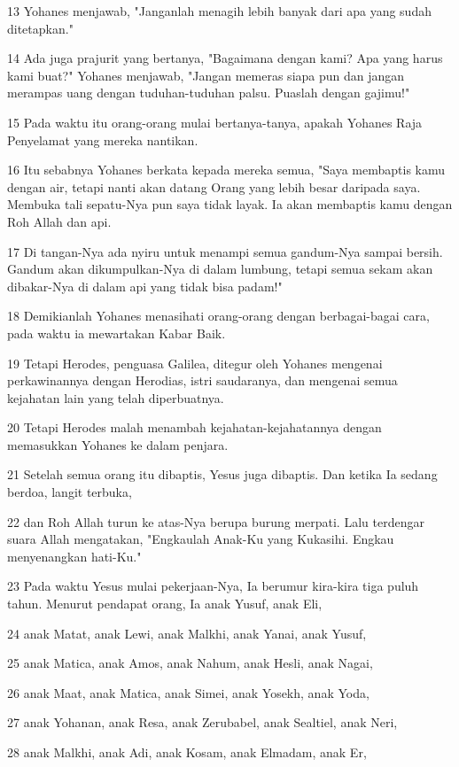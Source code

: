 \par 13 Yohanes menjawab, "Janganlah menagih lebih banyak dari apa yang sudah ditetapkan."
\par 14 Ada juga prajurit yang bertanya, "Bagaimana dengan kami? Apa yang harus kami buat?" Yohanes menjawab, "Jangan memeras siapa pun dan jangan merampas uang dengan tuduhan-tuduhan palsu. Puaslah dengan gajimu!"
\par 15 Pada waktu itu orang-orang mulai bertanya-tanya, apakah Yohanes Raja Penyelamat yang mereka nantikan.
\par 16 Itu sebabnya Yohanes berkata kepada mereka semua, "Saya membaptis kamu dengan air, tetapi nanti akan datang Orang yang lebih besar daripada saya. Membuka tali sepatu-Nya pun saya tidak layak. Ia akan membaptis kamu dengan Roh Allah dan api.
\par 17 Di tangan-Nya ada nyiru untuk menampi semua gandum-Nya sampai bersih. Gandum akan dikumpulkan-Nya di dalam lumbung, tetapi semua sekam akan dibakar-Nya di dalam api yang tidak bisa padam!"
\par 18 Demikianlah Yohanes menasihati orang-orang dengan berbagai-bagai cara, pada waktu ia mewartakan Kabar Baik.
\par 19 Tetapi Herodes, penguasa Galilea, ditegur oleh Yohanes mengenai perkawinannya dengan Herodias, istri saudaranya, dan mengenai semua kejahatan lain yang telah diperbuatnya.
\par 20 Tetapi Herodes malah menambah kejahatan-kejahatannya dengan memasukkan Yohanes ke dalam penjara.
\par 21 Setelah semua orang itu dibaptis, Yesus juga dibaptis. Dan ketika Ia sedang berdoa, langit terbuka,
\par 22 dan Roh Allah turun ke atas-Nya berupa burung merpati. Lalu terdengar suara Allah mengatakan, "Engkaulah Anak-Ku yang Kukasihi. Engkau menyenangkan hati-Ku."
\par 23 Pada waktu Yesus mulai pekerjaan-Nya, Ia berumur kira-kira tiga puluh tahun. Menurut pendapat orang, Ia anak Yusuf, anak Eli,
\par 24 anak Matat, anak Lewi, anak Malkhi, anak Yanai, anak Yusuf,
\par 25 anak Matica, anak Amos, anak Nahum, anak Hesli, anak Nagai,
\par 26 anak Maat, anak Matica, anak Simei, anak Yosekh, anak Yoda,
\par 27 anak Yohanan, anak Resa, anak Zerubabel, anak Sealtiel, anak Neri,
\par 28 anak Malkhi, anak Adi, anak Kosam, anak Elmadam, anak Er,
